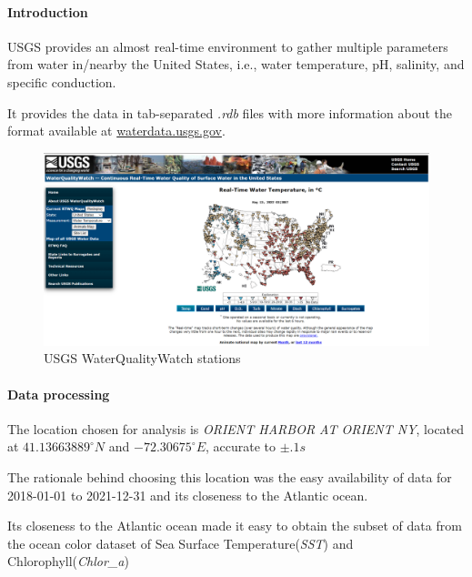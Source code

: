 \paragraph{Introduction}
    USGS provides an almost real-time environment to gather multiple parameters from water in/nearby the United States, i.e., water temperature, pH, salinity, and specific conduction.
    
    It provides the data in tab-separated \textit{.rdb} files with more information about the format available at \href{https://help.waterdata.usgs.gov/faq/about-tab-delimited-output}{waterdata.usgs.gov}.

    \begin{figure}[H]
        \centering
        \includegraphics[scale=0.30]{figs/usgs_water.png}
        \caption{USGS WaterQualityWatch stations}
    \end{figure}

\paragraph{Data processing}
    The location chosen for analysis is \textit{ORIENT HARBOR AT ORIENT NY}, located at $41.13663889^\circ N$ and $-72.30675^\circ E$, accurate to $\pm .1 s$

    The rationale behind choosing this location was the easy availability of data for 2018-01-01 to 2021-12-31 and its closeness to the Atlantic ocean.

    Its closeness to the Atlantic ocean made it easy to obtain the subset of data from the ocean color dataset of Sea Surface Temperature(\textit{SST}) and Chlorophyll(\textit{Chlor\_a})

